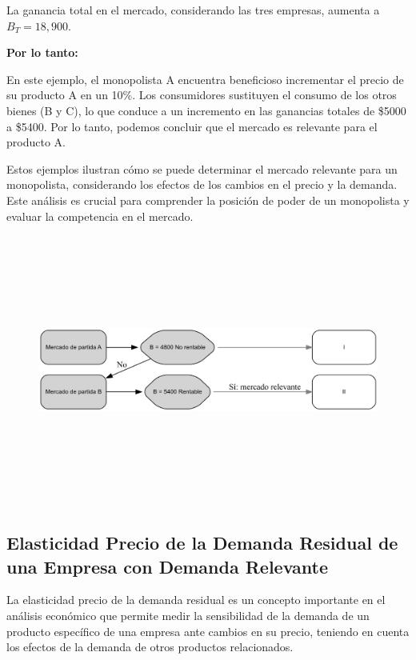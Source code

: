 \documentclass[
  letterpaper,
  DIV=11,
  numbers=noendperiod]{scrartcl}
\begin{document}
La ganancia total en el mercado, considerando las tres empresas, aumenta
a \(B_T = 18,900\).

\textbf{Por lo tanto:}

En este ejemplo, el monopolista A encuentra beneficioso incrementar el
precio de su producto A en un 10\%. Los consumidores sustituyen el
consumo de los otros bienes (B y C), lo que conduce a un incremento en
las ganancias totales de \$5000 a \$5400. Por lo tanto, podemos concluir
que el mercado es relevante para el producto A.

Estos ejemplos ilustran cómo se puede determinar el mercado relevante
para un monopolista, considerando los efectos de los cambios en el
precio y la demanda. Este análisis es crucial para comprender la
posición de poder de un monopolista y evaluar la competencia en el
mercado.

\begin{figure}[H]

{\centering \includegraphics[width=5.5in,height=3.5in]{index_files/figure-latex/dot-figure-2.png}

}

\end{figure}

\hypertarget{elasticidad-precio-de-la-demanda-residual-de-una-empresa-con-demanda-relevante}{%
\subsection{Elasticidad Precio de la Demanda Residual de una Empresa con
Demanda
Relevante}\label{elasticidad-precio-de-la-demanda-residual-de-una-empresa-con-demanda-relevante}}

La elasticidad precio de la demanda residual es un concepto importante
en el análisis económico que permite medir la sensibilidad de la demanda
de un producto específico de una empresa ante cambios en su precio,
teniendo en cuenta los efectos de la demanda de otros productos
relacionados.
\end{document}
